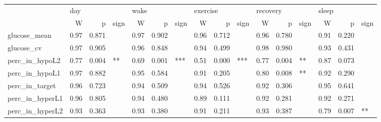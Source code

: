 \begin{tabular}{lrrlrrlrrlrrlrrl}
\toprule
{} & \multicolumn{3}{l}{day} & \multicolumn{3}{l}{wake} & \multicolumn{3}{l}{exercise} & \multicolumn{3}{l}{recovery} & \multicolumn{3}{l}{sleep} \\
{} &     W &      p & sign &     W &      p & sign &        W &      p & sign &        W &      p & sign &     W &      p & sign \\
\midrule
glucose_mean    &  0.97 &  0.871 &      &  0.97 &  0.902 &      &     0.96 &  0.712 &      &     0.96 &  0.780 &      &  0.91 &  0.220 &      \\
glucose_cv      &  0.97 &  0.905 &      &  0.96 &  0.848 &      &     0.94 &  0.499 &      &     0.98 &  0.980 &      &  0.93 &  0.431 &      \\
perc_in_hypoL2  &  0.77 &  0.004 &   ** &  0.69 &  0.001 &  *** &     0.51 &  0.000 &  *** &     0.77 &  0.004 &   ** &  0.87 &  0.073 &      \\
perc_in_hypoL1  &  0.97 &  0.882 &      &  0.95 &  0.584 &      &     0.91 &  0.205 &      &     0.80 &  0.008 &   ** &  0.92 &  0.290 &      \\
perc_in_target  &  0.96 &  0.723 &      &  0.94 &  0.509 &      &     0.94 &  0.526 &      &     0.92 &  0.306 &      &  0.95 &  0.641 &      \\
perc_in_hyperL1 &  0.96 &  0.805 &      &  0.94 &  0.480 &      &     0.89 &  0.111 &      &     0.92 &  0.281 &      &  0.92 &  0.271 &      \\
perc_in_hyperL2 &  0.93 &  0.363 &      &  0.93 &  0.380 &      &     0.91 &  0.211 &      &     0.93 &  0.387 &      &  0.79 &  0.007 &   ** \\
\bottomrule
\end{tabular}
